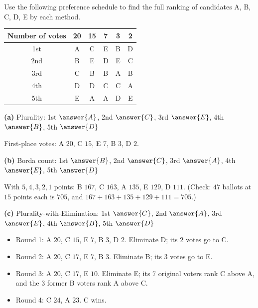 \documentclass[12pt]{ximera}
\begin{document}
\begin{problem}
Use the following preference schedule to find the full ranking of candidates A, B, C,
D, E by each method.
\begin{center}
\begin{tabular}{c|ccccc}
Number of votes & 20 & 15 & 7 & 3 & 2\\\hline
1st & A & C & E & B & D\\
2nd & B & E & D & E & C\\
3rd & C & B & B & A & B\\
4th & D & D & C & C & A\\
5th & E & A & A & D & E
\end{tabular}
\end{center}

\begin{prompt}
\textbf{(a)} Plurality: 1st $\answer{A}$, 2nd $\answer{C}$, 3rd $\answer{E}$,
4th $\answer{B}$, 5th $\answer{D}$

\begin{feedback}
First-place votes: A $20$, C $15$, E $7$, B $3$, D $2$.
\end{feedback}
\end{prompt}

\begin{prompt}
\textbf{(b)} Borda count: 1st $\answer{B}$, 2nd $\answer{C}$, 3rd $\answer{A}$,
4th $\answer{E}$, 5th $\answer{D}$

\begin{feedback}
With $5,4,3,2,1$ points: B $167$, C $163$, A $135$, E $129$, D $111$. (Check: $47$
ballots at $15$ points each is $705$, and $167+163+135+129+111=705$.)
\end{feedback}
\end{prompt}

\begin{prompt}
\textbf{(c)} Plurality-with-Elimination: 1st $\answer{C}$, 2nd $\answer{A}$,
3rd $\answer{E}$, 4th $\answer{B}$, 5th $\answer{D}$

\begin{feedback}
\begin{itemize}
\item Round 1: A $20$, C $15$, E $7$, B $3$, D $2$. Eliminate D; its $2$ votes go to C.
\item Round 2: A $20$, C $17$, E $7$, B $3$. Eliminate B; its $3$ votes go to E.
\item Round 3: A $20$, C $17$, E $10$. Eliminate E; its $7$ original voters rank C
      above A, and the $3$ former B voters rank A above C.
\item Round 4: C $24$, A $23$. C wins.
\end{itemize}
\end{feedback}
\end{prompt}


\end{problem}
\end{document}
